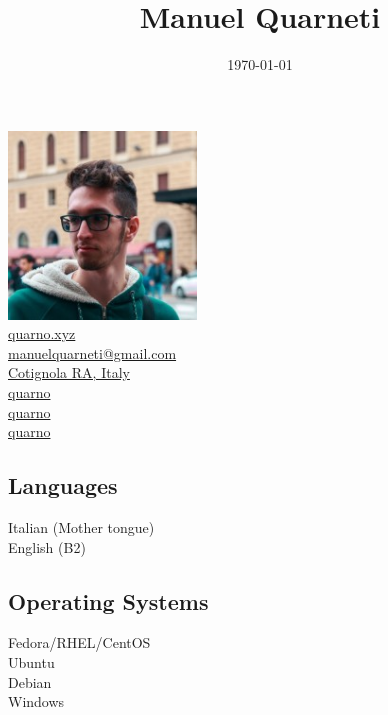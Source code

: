 \documentclass{article}
\title{\HUGE Manuel Quarneti \\[-20pt]}
\author{}
\date{\today}
\begin{document}
\setmainfont{Noto Sans}

\setlength{\columnsep}{2.2em}
\setlength{\columnseprule}{4pt}
\begin{paracol}{2}

\begin{center}
    \includegraphics[height=5cm]{me} \\[20pt]

    \href{https://quarno.xyz/}{ quarno.xyz} \\[8pt]
    \href{mailto:manuelquarneti@gmail.com}{ manuelquarneti@gmail.com} \\[8pt]
    \href{https://www.openstreetmap.org/relation/43112}{ Cotignola RA, Italy} \\[8pt]
    \href{https://github.com/quarno}{ quarno} \\[8pt]
    \href{https://www.linkedin.com/in/quarno}{ quarno} \\[8pt]
    \href{https://t.me/quarno}{ quarno}

    \vfill

    \subsection*{\center Languages}
     Italian (Mother tongue) \\[4pt]
     English (B2)

    \subsection*{\center Operating Systems}
     Fedora/RHEL/CentOS \\[4pt]
     Ubuntu \\[4pt]
     Debian \\[4pt]
     Windows


\end{center}
\end{paracol}
\end{document}
